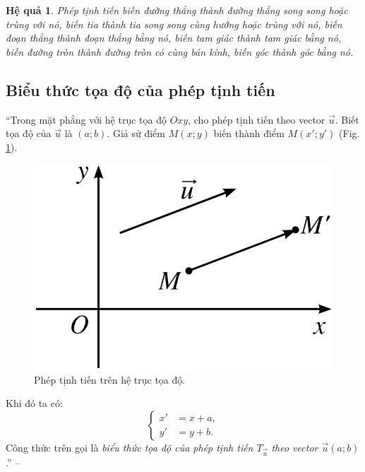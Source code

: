\documentclass[oneside]{book}
\numberwithin{equation}{section}
\newtheorem{hequa}{Hệ quả}[section]
\begin{document}
\begin{hequa}
	\label{cor:phep tinh tien}
	Phép tịnh tiến biến đường thẳng thành đường thẳng song song hoặc trùng với nó, biến tia thành tia song song cùng hướng hoặc trùng với nó, biến đoạn thẳng thành đoạn thẳng bằng nó, biến tam giác thành tam giác bằng nó, biến đường tròn thành đường tròn có cùng bán kính, biến góc thành góc bằng nó.
\end{hequa}

\subsection{Biểu thức tọa độ của phép tịnh tiến}
``Trong mặt phẳng với hệ trục tọa độ $Oxy$, cho phép tịnh tiến theo vector $\vec{u}$. Biết tọa độ của $\vec{u}$ là $(a;b)$. Giả sử điểm $M(x;y)$ biến thành điểm $M(x';y')$ (Fig. \ref{fig:phep tinh tien tren he truc toa do}).

\begin{figure}[H]
	\centering
	\includegraphics[scale=0.15]{phep_tinh_tien_tren_he_truc_toa_do}
	\caption{Phép tịnh tiến trên hệ trục tọa độ.}
	\label{fig:phep tinh tien tren he truc toa do}
\end{figure}
Khi đó ta có:
\begin{equation*}
	\boxed{\left\{\begin{split}
		x' &= x + a,\\
		y' &= y + b.
	\end{split}\right.}
\end{equation*}
Công thức trên gọi là \textit{biểu thức tọa độ của phép tịnh tiến $T_{\vec{u}}$ theo vector $\vec{u}(a;b)$}.'' -- \cite[pp. 6--7]{SGK_Toan_11_hinh_hoc_nang_cao}
\end{document}
